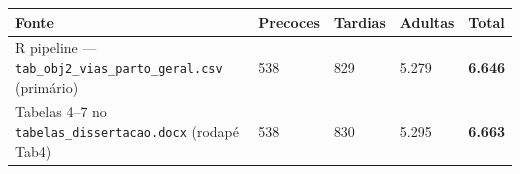 \documentclass[
]{article}
\begin{document}
\begin{longtable}[]{@{}lllll@{}}
\toprule
\begin{minipage}[b]{0.17\columnwidth}\raggedright
Fonte\strut
\end{minipage} & \begin{minipage}[b]{0.17\columnwidth}\raggedright
Precoces\strut
\end{minipage} & \begin{minipage}[b]{0.17\columnwidth}\raggedright
Tardias\strut
\end{minipage} & \begin{minipage}[b]{0.17\columnwidth}\raggedright
Adultas\strut
\end{minipage} & \begin{minipage}[b]{0.17\columnwidth}\raggedright
Total\strut
\end{minipage}\tabularnewline
\midrule
\endhead
\begin{minipage}[t]{0.17\columnwidth}\raggedright
R pipeline --- \texttt{tab\_obj2\_vias\_parto\_geral.csv}
(primário)\strut
\end{minipage} & \begin{minipage}[t]{0.17\columnwidth}\raggedright
538\strut
\end{minipage} & \begin{minipage}[t]{0.17\columnwidth}\raggedright
829\strut
\end{minipage} & \begin{minipage}[t]{0.17\columnwidth}\raggedright
5.279\strut
\end{minipage} & \begin{minipage}[t]{0.17\columnwidth}\raggedright
\textbf{6.646}\strut
\end{minipage}\tabularnewline
\begin{minipage}[t]{0.17\columnwidth}\raggedright
Tabelas 4--7 no \texttt{tabelas\_dissertacao.docx} (rodapé Tab4)\strut
\end{minipage} & \begin{minipage}[t]{0.17\columnwidth}\raggedright
538\strut
\end{minipage} & \begin{minipage}[t]{0.17\columnwidth}\raggedright
830\strut
\end{minipage} & \begin{minipage}[t]{0.17\columnwidth}\raggedright
5.295\strut
\end{minipage} & \begin{minipage}[t]{0.17\columnwidth}\raggedright
\textbf{6.663}\strut
\end{minipage}\tabularnewline

\end{longtable}
\end{document}
